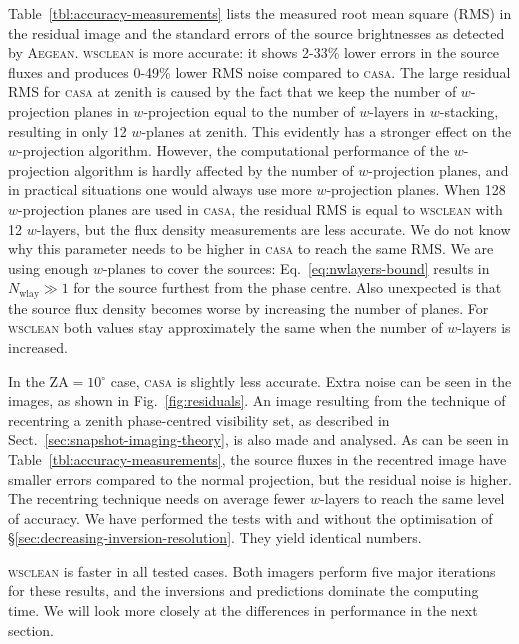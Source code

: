 \documentclass[useAMS,usenatbib]{mn2e}
\newcommand{\degree}{\ensuremath{^{\circ}}\xspace}
\begin{document}
Table~\ref{tbl:accuracy-measurements} lists the measured root mean square (RMS) in the residual image and the standard errors of the source brightnesses as detected by \textsc{Aegean}. \textsc{wsclean} is more accurate: it shows 2-33\% lower errors in the source fluxes and produces 0-49\% lower RMS noise compared to \textsc{casa}. The large residual RMS for \textsc{casa} at zenith is caused by the fact that we keep the number of $w$-projection planes in $w$-projection equal to the number of $w$-layers in $w$-stacking, resulting in only 12 $w$-planes at zenith. This evidently has a stronger effect on the $w$-projection algorithm. However, the computational performance of the $w$-projection algorithm is hardly affected by the number of $w$-projection planes, and in practical situations one would always use more $w$-projection planes. When 128 $w$-projection planes are used in \textsc{casa}, the residual RMS is equal to \textsc{wsclean} with 12 $w$-layers, but the flux density measurements are less accurate. We do not know why this parameter needs to be higher in \textsc{casa} to reach the same RMS. We are using enough $w$-planes to cover the sources: Eq.~\eqref{eq:nwlayers-bound} results in $N_\textrm{wlay}\gg 1$ for the source furthest from the phase centre. Also unexpected is that the source flux density becomes worse by increasing the number of planes. For \textsc{wsclean} both values stay approximately the same when the number of $w$-layers is increased.

In the $\textrm{ZA}=10\degree$ case, \textsc{casa} is slightly less accurate. Extra noise can be seen in the images, as shown in Fig.~\ref{fig:residuals}. An image resulting from the technique of recentring a zenith phase-centred visibility set, as described in Sect.~\ref{sec:snapshot-imaging-theory}, is also made and analysed. As can be seen in Table~\ref{tbl:accuracy-measurements}, the source fluxes in the recentred image have smaller errors compared to the normal projection, but the residual noise is higher. The recentring technique needs on average fewer $w$-layers to reach the same level of accuracy. We have performed the tests with and without the optimisation of \S\ref{sec:decreasing-inversion-resolution}. They yield identical numbers.

\textsc{wsclean} is faster in all tested cases. Both imagers perform five major iterations for these results, and the inversions and predictions dominate the computing time. We will look more closely at the differences in performance in the next section.
\end{document}
